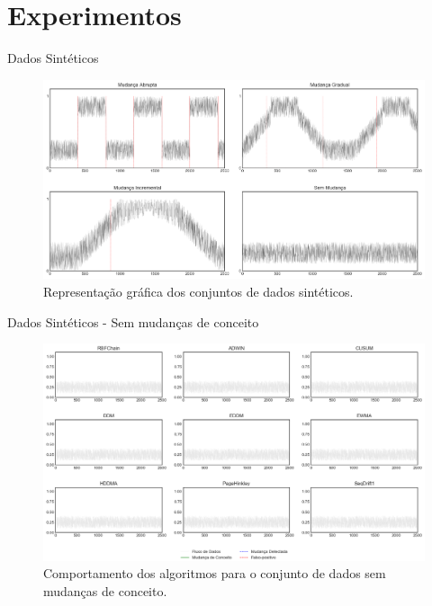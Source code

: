 \documentclass[10pt]{beamer}
\begin{document}
\section{Experimentos}

\begin{frame}{Dados Sintéticos}
    \begin{figure}[ht]
        \begin{center}
            \includegraphics[width=\textwidth]{imagens/conjuntos_dados_sinteticos.png}
            \caption{Representação gráfica dos conjuntos de dados sintéticos.}
            \label{fig:conjuntos_dados_sinteticos}
        \end{center}
    \end{figure}
\end{frame}

\begin{frame}{Dados Sintéticos -  Sem mudanças de conceito}
    \begin{figure}[t]
        \begin{center}
            \includegraphics[width=\textwidth]{imagens/nochange.png}
            \caption{Comportamento dos algoritmos para o conjunto de dados sem mudanças de conceito.}
            \label{fig:exp_sem_mudancas}
        \end{center}
    \end{figure}
\end{frame}
\end{document}
